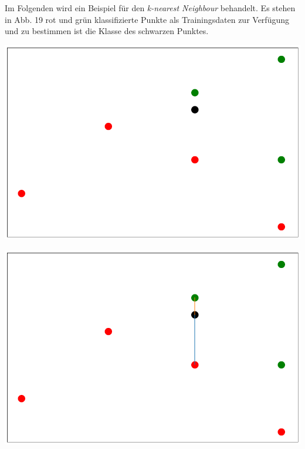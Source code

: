\documentclass[fontsize=11pt]{scrartcl}
\newenvironment{Figure}
  {\par\medskip\noindent\minipage{\linewidth}}
  {\endminipage\par\medskip}
\begin{document}
                
                Im Folgenden wird ein Beispiel für den \emph{k-nearest Neighbour} behandelt. Es stehen in Abb. 19 rot und grün klassifizierte Punkte als Trainingsdaten zur Verfügung und zu bestimmen ist die Klasse des schwarzen Punktes.\par  
                \begin{Figure}
                    \begin{minipage}[b]{.25\linewidth}
                        \includegraphics[width=\linewidth]{knn1_neu.png}
                        \label{fig:knn1}
                    \end{minipage}
                    \hspace{.1\linewidth}
                    \begin{minipage}[b]{.25\linewidth}
                        \includegraphics[width=\linewidth]{knn3.png}

\end{minipage}
\end{Figure}
\end{document}
